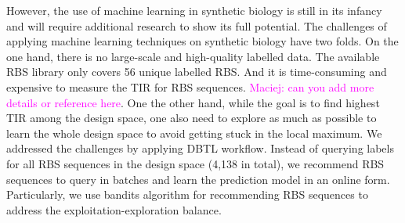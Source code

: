\documentclass{article}
\newcommand{\mengyan}[1]{\textcolor{magenta}{#1}}
\begin{document}
However, the use of machine learning in synthetic biology is still in its infancy and will require additional research to show its full potential. 
The challenges of applying machine learning techniques on synthetic biology have two folds.
On the one hand, there is no large-scale and high-quality labelled data. 
The available RBS library \cite{jervis2018machine} only covers 56 unique labelled RBS.
And it is time-consuming and expensive to measure the TIR for RBS sequences. \mengyan{Maciej: can you add more details or reference here}.
One the other hand,  while the goal is to find highest TIR among the design space, one also need to explore as much as possible to learn the whole design space to avoid getting stuck in the local maximum.  
We addressed the challenges by applying DBTL workflow. 
Instead of querying labels for all RBS sequences in the design space (4,138 in total), we recommend RBS sequences to query in batches and learn the prediction model in an online form.
Particularly, we use bandits algorithm for recommending RBS sequences to address the exploitation-exploration balance. 
\end{document}
